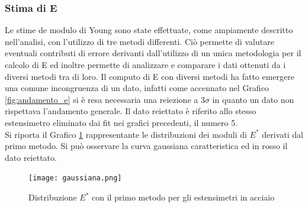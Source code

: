 \documentclass[a4paper,11pt,oneside]{article}
\begin{document}
\subsubsection*{Stima di E}
Le stime de modulo di Young sono state effettuate, come ampiamente descritto nell'analisi, con l'utilizzo di tre metodi differenti. Ciò permette di valutare eventuali contributi di errore derivanti dall'utilizzo di un unica metodologia per il calcolo di E ed inoltre permette di analizzare e comparare i dati ottenuti da i diversi metodi tra di loro. Il computo di E con diversi metodi ha fatto emergere una comune incongruenza di un dato, infatti come accennato nel Grafico \ref{fig:andamento_e} si è resa necessaria una reiezione a $3\sigma$ in quanto un dato non rispettava l'andamento generale. Il dato reiettato è riferito allo stesso estensimetro eliminato dai fit nei grafici precedenti, il numero 5.\\
Si riporta il Grafico \ref{fig:gaussiana} rappresentante le distribuzioni dei moduli di $E^{\ast}$ derivati dal primo metodo. Si può osservare la curva gaussiana caratteristica ed in rosso il dato reiettato.

\begin{figure}[h!]
    \centering
    \caption{Distribuzione $E^{\ast}$ con il primo metodo per gli estensimetri in acciaio}
    \label{fig:gaussiana}
    \texttt{[image: gaussiana.png]}
\end{figure}
\end{document}
